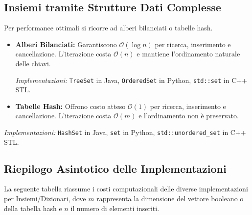 \documentclass[12pt, a4paper]{article}
\begin{document}
\subsection{Insiemi tramite Strutture Dati Complesse}
Per performance ottimali si ricorre ad alberi bilanciati o tabelle hash.

\begin{itemize}
    \item \textbf{Alberi Bilanciati:} Garantiscono $\mathcal{O}(\log n)$ per ricerca, inserimento e cancellazione. L'iterazione costa $\mathcal{O}(n)$ e mantiene l'ordinamento naturale delle chiavi.

    \textit{Implementazioni:} \texttt{TreeSet} in Java, \texttt{OrderedSet} in Python, \texttt{std::set} in C++ STL.

    \item \textbf{Tabelle Hash:} Offrono costo atteso $\mathcal{O}(1)$ per ricerca, inserimento e cancellazione. L'iterazione costa $\mathcal{O}(m)$ e l'ordinamento non è preservato.
\end{itemize}
\textit{Implementazioni:} \texttt{HashSet} in Java, \texttt{set} in Python,
\texttt{std::unordered\_set} in C++ STL.

\subsection{Riepilogo Asintotico delle Implementazioni}

La seguente tabella riassume i costi computazionali delle diverse implementazioni per Insiemi/Dizionari, dove $m$ rappresenta la dimensione del vettore booleano o della tabella hash e $n$ il numero di elementi inseriti.
\end{document}
